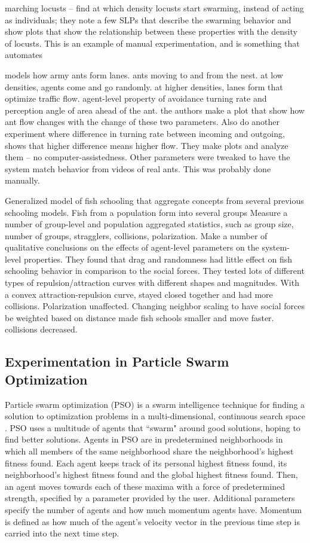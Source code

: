 marching locusts \cite{buhl2006dom} -- find at which density locusts start swarming, instead of acting as individuals; they note a few SLPs that describe the swarming behavior and show plots that show the relationship between these properties with the density of locusts.
This is an example of manual experimentation, and is something that \fw automates

\cite{couzin2003sol}
models how army ants form lanes.
ants moving to and from the nest.
at low densities, agents come and go randomly.
at higher densities, lanes form that optimize traffic flow.
agent-level property of avoidance turning rate and perception angle of area ahead of the ant.
the authors make a plot that show how ant flow changes with the change of these two parameters.
Also do another experiment where difference in turning rate between incoming and outgoing, shows that higher difference means higher flow.
They make plots and analyze them -- no computer-assistedness.
Other parameters were tweaked to have the system match behavior from videos of real ants.
This was probably done manually.

\cite{parrish2002sof}
Generalized model of fish schooling that aggregate concepts from several previous schooling models.
Fish from a population form into several groups
Measure a number of group-level and population aggregated statistics, such as group size, number of groups, stragglers, collisions, polarization.
Make a number of qualitative conclusions on the effects of agent-level parameters on the system-level properties.
They found that drag and randomness had little effect on fish schooling behavior in comparison to the social forces.
They tested lots of different types of repulsion/attraction curves with different shapes and magnitudes.
With a convex attraction-repulsion curve, stayed closed together and had more collisions. Polarization unaffected.
Changing neighbor scaling to have social forces be weighted based on distance made fish schools smaller and move faster. collisions decreased.

\subsection{Experimentation in Particle Swarm Optimization}

Particle swarm optimization (PSO) is a swarm intelligence technique for finding a solution to optimization problems in a multi-dimensional, continuous search space \cite{kennedy1995pso}.
PSO uses a multitude of agents that ``swarm" around good solutions, hoping to find better solutions.
Agents in PSO are in predetermined neighborhoods in which all members of the same neighborhood share the neighborhood's highest fitness found.
Each agent keeps track of its personal highest fitness found, its neighborhood's highest fitness found and the global highest fitness found.
Then, an agent moves towards each of these maxima with a force of predetermined strength, specified by a parameter provided by the user.
Additional parameters specify the number of agents and how much momentum agents have.
Momentum is defined as how much of the agent's velocity vector in the previous time step is carried into the next time step.

